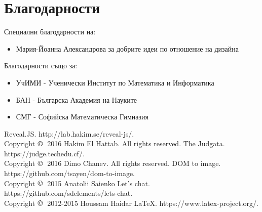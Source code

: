 \documentclass[12pt]{article}
\begin{document}
	\section{Благодарности}
	Специални благодарности на:
	\begin{itemize}
		\item Мария-Йоанна Александрова за добрите идеи по отношение на дизайна
	\end{itemize}
	Благодарности също за:
	\begin{itemize}
		\item УчИМИ - Ученически Институт по Математика и Информатика
		\item БАН - Българска Академия на Науките
		\item СМГ - Софийска Математическа Гимназия
	\end{itemize}
	\begin{thebibliography}{9}
		{Reveal.JS}.
		{http://lab.hakim.se/reveal-js/}. \\
		Copyright $\copyright\;$ 2016 Hakim El Hattab. All rights reserved.
		{The Judgata}.
		{https://judge.techedu.cf/}. \\
		Copyright $\copyright\;$ 2016 Dimo Chanev. All rights reserved.
		{DOM to image}.
		{https://github.com/tsayen/dom-to-image}. \\
		Copyright $\copyright\;$ 2015 Anatolii Saienko
		{Let's chat}.
		{https://github.com/sdelements/lets-chat}. \\
		Copyright $\copyright\;$ 2012-2015 Houssam Haidar
		{\LaTeX}.
		{https://www.latex-project.org/}.
	\end{thebibliography}
\end{document}
